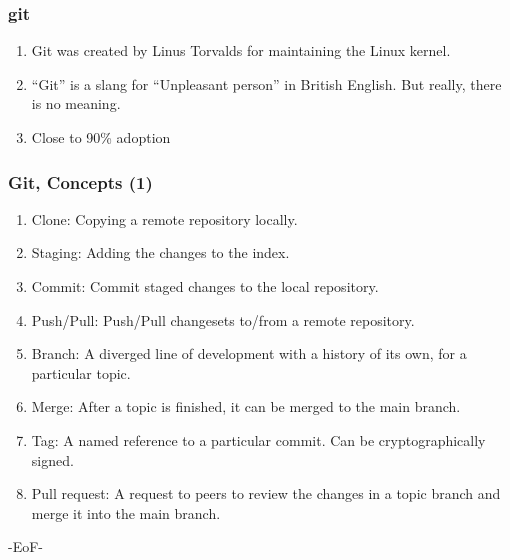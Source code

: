 \documentclass{beamer}
\begin{document}
\begin{frame}
  \frametitle{git}
  \begin{enumerate}
  \item Git was created by Linus Torvalds for maintaining the Linux
    kernel.
  \item ``Git'' is a slang for ``Unpleasant person'' in British
    English. But really, there is no meaning.
  \item Close to 90\% adoption
  \end{enumerate}
\end{frame}

\begin{frame}
  \frametitle{Git, Concepts (1)}
  \begin{enumerate}
  \item Clone: Copying a remote repository locally.
  \item Staging: Adding the changes to the index.
  \item Commit: Commit staged changes to the local repository.
  \item Push/Pull: Push/Pull changesets to/from a remote repository.
  \item Branch: A diverged line of development with a history of its
    own, for a particular topic.
  \item Merge: After a topic is finished, it can be merged to the main
    branch.
  \item Tag: A named reference to a particular commit. Can be
    cryptographically signed.
  \item Pull request: A request to peers to review the changes in a
    topic branch and merge it into the main branch.
  \end{enumerate}
\end{frame}

\begin{frame}
  -EoF-
\end{frame}
\end{document}
